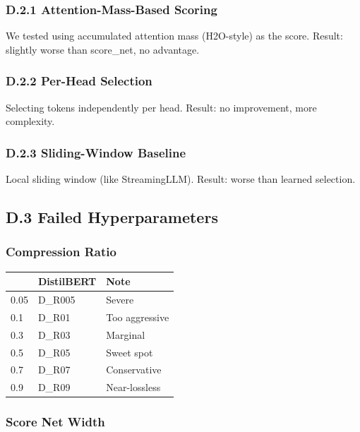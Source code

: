 \subsubsection{D.2.1 Attention-Mass-Based Scoring}

We tested using accumulated attention mass (H2O-style) as the score. Result: 
slightly worse than score\_net, no advantage.

\subsubsection{D.2.2 Per-Head Selection}

Selecting tokens independently per head. Result: no improvement, more 
complexity.

\subsubsection{D.2.3 Sliding-Window Baseline}

Local sliding window (like StreamingLLM). Result: worse than learned selection.

\subsection{D.3 Failed Hyperparameters}

\subsubsection{Compression Ratio}

\begin{table}[H]
\centering
\small
\begin{tabular}{lll}
\toprule
\textbf{} & \textbf{DistilBERT} & \textbf{Note} \\
\midrule
0.05 & {{D\_R005}} & Severe \\
0.1 & {{D\_R01}} & Too aggressive \\
0.3 & {{D\_R03}} & Marginal \\
0.5 & {{D\_R05}} & Sweet spot \\
0.7 & {{D\_R07}} & Conservative \\
0.9 & {{D\_R09}} & Near-lossless \\
\bottomrule
\end{tabular}
\end{table}

\subsubsection{Score Net Width}

